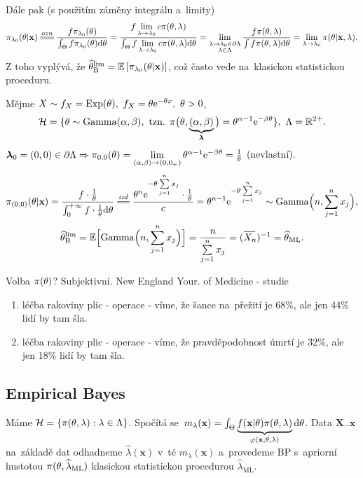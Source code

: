 Dále pak (s použitím záměny integrálu a~limity) $$\pi_{\lambda_0}(\t|\textbf{x})\equal{ozn}\frac{f\pi_{\lambda_0}(\t)}{\int_\Theta f\pi_{\lambda_0}(\t)\d\t}=\frac{f\lim\limits_{\lambda\to\lambda_0}c\pi(\t,\lambda)}{\int_\Theta f\lim\limits_{\lambda\to\lambda_0}c\pi(\t,\lambda) \d\t}=\lim\limits_{\substack{
		\lambda\to\lambda_0\in\partial\Lambda\\\lambda\in\Lambda	}
}\frac{f\pi(\t,\lambda)}{\int f\pi(\t,\lambda)\d\t}=\lim\limits_{\lambda\to\lambda_0}\pi(\t|\textbf{x},\lambda).$$
Z toho vyplývá, že $\widehat{\theta}_{\mathrm{{\footnotesize B }}}^\mathrm{lim} =\mathbb{E}\left[ \pi_{\lambda_0}(\theta|\textbf{x}) \right]$, což často vede na~klasickou statistickou proceduru.

\begin{example}
	Mějme $X\sim f_X=\mathrm{Exp}(\theta),~f_X=\theta\mathrm{e}^{-\theta x},~\theta>0$, $$\mathcal{H}=\{\theta\sim\mathrm{Gamma}(\alpha,\beta),~\text{tzn. }\pi\big(\theta,\underbrace{(\alpha,\beta)}_{\boldsymbol{\lambda}}\big)=\theta^{\alpha-1}\mathrm{e}^{-\beta\theta}\},~\Lambda=\mathbb{R}^{2+}.$$ $\boldsymbol{\lambda}_0=(0,0)\in\partial\Lambda\Rightarrow\pi_{0,0}(\theta)=\lim\limits_{(\alpha,\beta)\to(0,0_+)}\theta^{\alpha-1}\mathrm{e}^{-\beta\theta}=\frac{1}{\theta}$ (nevlastní).
	$$\pi_{(0,0)}(\t|\textbf{x})=\frac{f\cdot\frac{1}{\t}}{\int_{0}^{+\infty}f\cdot\frac{1}{\t}\d\t}\equal{iid}\frac{\t^n\e{-\t\sumjn x_j}\cdot\frac{1}{\t}}{c}=\t^{n-1}\e{-\t\sumjn x_j}\sim\mathrm{Gamma}\Big(n,\sumjn x_j\Big),$$
	$$\htb^{\mathrm{lim}}=\E\Big[\mathrm{Gamma}\Big(n,\sumjn x_j\Big)\Big]=\frac{n}{\sumjn x_j}=\inv{(\Oxn)}=\html.$$
\end{example}
\begin{example}
	Volba $\pi(\theta)$? Subjektivní. New England Your. of Medicine - studie\begin{enumerate}[1)]
		\item léčba rakoviny plic - operace - víme, že šance na~přežití je 68\%, ale jen 44\% lidí by tam šla. 
		\item léčba rakoviny plic - operace - víme, že pravděpodobnost úmrtí je 32\%, ale jen 18\% lidí by tam šla. 
	\end{enumerate}
\end{example}

\subsection{Empirical Bayes}
Máme $\mathcal{H}=\{\pi(\theta,\lambda):\lambda\in\Lambda\}$. Spočítá se~$m_\lambda(\textbf{x})=\int_\Theta\underbrace{f(\textbf{x}|\theta)\pi(\theta,\lambda)}_{\varphi(\textbf{x},\theta,\lambda)}\mathrm{d}\theta$. Data $\textbf{X}..\textbf{x}$ na~základě dat odhadneme $\widehat{\lambda}(\textbf{x})$ v~té $m_\lambda(\textbf{x})$ a~provedeme BP s~apriorní hustotou $\pi(\theta,\widehat{\lambda}_{\mathrm{ML}})$ klasickou statistickou procedurou $\widehat{\lambda}_{\mathrm{ML}}$.

